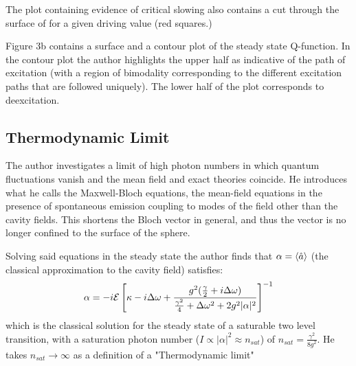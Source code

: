 The plot containing evidence of critical slowing also contains a cut through the surface of \autocite[Figure 2]{Carmichael2015} for a given driving value (red squares.)

Figure 3b contains a surface and a contour plot of the steady state Q-function. In the contour plot the author highlights the upper half as indicative of the path of excitation (with a region of bimodality corresponding to the different excitation paths that are followed uniquely). The lower half of the plot corresponds to deexcitation.

\subsection{Thermodynamic Limit}

The author investigates a limit of high photon numbers in which quantum fluctuations vanish and the mean field and exact theories coincide. He introduces what he calls the Maxwell-Bloch equations, the mean-field equations in the presence of spontaneous emission coupling to modes of the field other than the cavity fields. This shortens the Bloch vector in general, and thus the vector is no longer confined to the surface of the sphere. 

Solving said equations in the steady state the author finds that $\alpha = \langle \hat{a} \rangle$ (the classical approximation to the cavity field) satisfies:
\begin{equation}
	\alpha = -i \mathcal{E} \left [ \kappa - i \Delta \omega + \frac{g^2(\frac{\gamma}{2} +i \Delta \omega)}{\frac{\gamma^2}{4} + \Delta \omega^2 + 2 g^2 |\alpha|^2} \right ]^{-1}
\end{equation}
which is the classical solution for the steady state of a saturable two level transition, with a saturation photon number ($I \propto |\alpha|^2 \approx n_{sat}$) of $n_{sat} = \frac{\gamma^2}{8g^2}$. He takes $n_{sat} \rightarrow \infty$ as a definition of a "Thermodynamic limit" 
